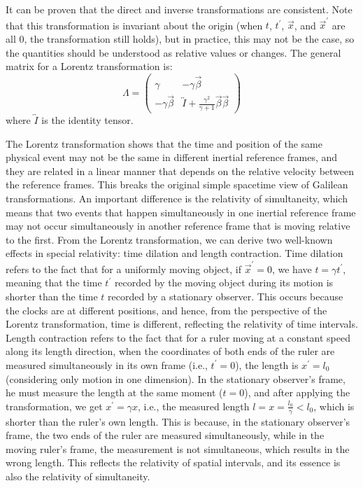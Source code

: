 \documentclass{article}
\begin{document}
It can be proven that the direct and inverse transformations are consistent. Note that this transformation is invariant about the origin (when $t$, $t^{'}$, $\vec{x}$, and $\vec{x}^{'}$ are all 0, the transformation still holds), but in practice, this may not be the case, so the quantities should be understood as relative values or changes. The general matrix for a Lorentz transformation is:
$$ \Lambda = \begin{pmatrix} \gamma & -\gamma \vec{\beta} \\ -\gamma \vec{\beta} & \overleftrightarrow{I} + \frac{\gamma^2} {\gamma + 1} \vec{\beta} \vec{\beta} \end{pmatrix} $$
where $\overleftrightarrow{I}$ is the identity tensor.

The Lorentz transformation shows that the time and position of the same physical event may not be the same in different inertial reference frames, and they are related in a linear manner that depends on the relative velocity between the reference frames. This breaks the original simple spacetime view of Galilean transformations. An important difference is the relativity of simultaneity, which means that two events that happen simultaneously in one inertial reference frame may not occur simultaneously in another reference frame that is moving relative to the first. From the Lorentz transformation, we can derive two well-known effects in special relativity: time dilation and length contraction. Time dilation refers to the fact that for a uniformly moving object, if $\vec{x}^{'} = 0$, we have $t = \gamma t^{'}$, meaning that the time $t^{'}$ recorded by the moving object during its motion is shorter than the time $t$ recorded by a stationary observer. This occurs because the clocks are at different positions, and hence, from the perspective of the Lorentz transformation, time is different, reflecting the relativity of time intervals. Length contraction refers to the fact that for a ruler moving at a constant speed along its length direction, when the coordinates of both ends of the ruler are measured simultaneously in its own frame (i.e., $t^{'} = 0$), the length is $x^{'} = l_0$ (considering only motion in one dimension). In the stationary observer's frame, he must measure the length at the same moment ($t = 0$), and after applying the transformation, we get $x^{'} = \gamma x$, i.e., the measured length $l = x = \frac{l_0}{\gamma} < l_0$, which is shorter than the ruler's own length. This is because, in the stationary observer's frame, the two ends of the ruler are measured simultaneously, while in the moving ruler's frame, the measurement is not simultaneous, which results in the wrong length. This reflects the relativity of spatial intervals, and its essence is also the relativity of simultaneity.
\end{document}
